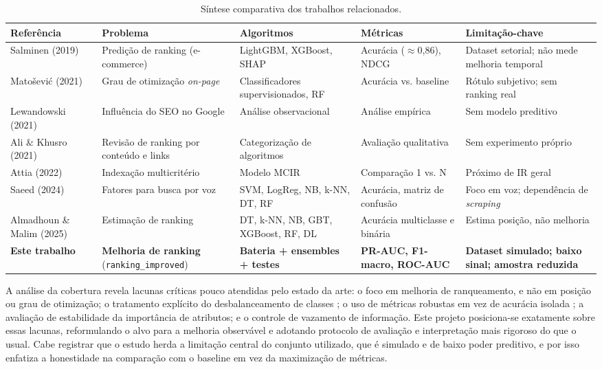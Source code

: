 \documentclass[12pt]{article}
\begin{document}
\begin{table}[ht]
\centering
\caption{Síntese comparativa dos trabalhos relacionados.}
\label{tab:relacionados}
\footnotesize
\begin{tabular}{p{2.3cm}p{2.6cm}p{2.4cm}p{2.4cm}p{2.6cm}}
\toprule
\textbf{Referência} & \textbf{Problema} & \textbf{Algoritmos} & \textbf{Métricas} & \textbf{Limitação-chave} \\
\midrule
Salminen (2019) & Predição de ranking (e-commerce) & LightGBM, XGBoost, SHAP & Acurácia ($\approx$0,86), NDCG & Dataset setorial; não mede melhoria temporal \\
Matošević (2021) & Grau de otimização \textit{on-page} & Classificadores supervisionados, RF & Acurácia vs. baseline & Rótulo subjetivo; sem ranking real \\
Lewandowski (2021) & Influência do SEO no Google & Análise observacional & Análise empírica & Sem modelo preditivo \\
Ali \& Khusro (2021) & Revisão de ranking por conteúdo e links & Categorização de algoritmos & Avaliação qualitativa & Sem experimento próprio \\
Attia (2022) & Indexação multicritério & Modelo MCIR & Comparação 1 vs. N & Próximo de IR geral \\
Saeed (2024) & Fatores para busca por voz & SVM, LogReg, NB, k-NN, DT, RF & Acurácia, matriz de confusão & Foco em voz; dependência de \textit{scraping} \\
Almadhoun \& Malim (2025) & Estimação de ranking & DT, k-NN, NB, GBT, XGBoost, RF, DL & Acurácia multiclasse e binária & Estima posição, não melhoria \\
\textbf{Este trabalho} & \textbf{Melhoria de ranking} (\texttt{ranking\_improved}) & \textbf{Bateria + ensembles + testes} & \textbf{PR-AUC, F1-macro, ROC-AUC} & \textbf{Dataset simulado; baixo sinal; amostra reduzida} \\
\bottomrule
\end{tabular}
\end{table}

A análise da cobertura revela lacunas críticas pouco atendidas pelo estado da arte: o foco em
melhoria de ranqueamento, e não em posição ou grau de otimização; o tratamento explícito do
desbalanceamento de classes \cite{he2009}; o uso de métricas robustas em vez de acurácia isolada
\cite{saito2015}; a avaliação de estabilidade da importância de atributos; e o controle de
vazamento de informação. Este projeto posiciona-se exatamente sobre essas lacunas, reformulando o
alvo para a melhoria observável e adotando protocolo de avaliação e interpretação mais rigoroso do
que o usual. Cabe registrar que o estudo herda a limitação central do conjunto utilizado, que é
simulado e de baixo poder preditivo, e por isso enfatiza a honestidade na comparação com o
baseline em vez da maximização de métricas.
\end{document}
